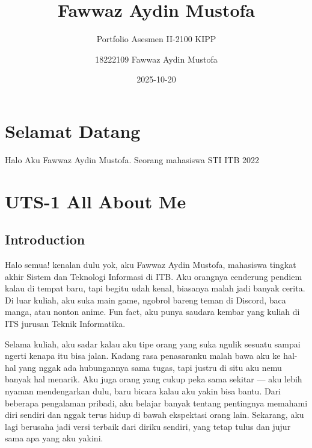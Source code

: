 \documentclass[
  letterpaper,
  DIV=11,
  numbers=noendperiod]{scrreprt}
\title{Fawwaz Aydin Mustofa}
\subtitle{Portfolio Asesmen II-2100 KIPP}
\author{18222109 Fawwaz Aydin Mustofa}
\date{2025-10-20}
\renewcommand*\contentsname{Table of contents}
\newcommand\contentsname{Table of contents}
\begin{document}
\maketitle

\renewcommand*\contentsname{Table of contents}
{
\hypersetup{linkcolor=}
\setcounter{tocdepth}{2}
\tableofcontents
}


\chapter*{Selamat Datang}\label{selamat-datang}


Halo Aku Fawwaz Aydin Mustofa. Seorang mahasiswa STI ITB 2022


\chapter{UTS-1 All About Me}\label{uts-1-all-about-me}

\section{\texorpdfstring{\textbf{Introduction}}{Introduction}}\label{introduction}

Halo semua! kenalan dulu yok, aku Fawwaz Aydin Mustofa, mahasiswa
tingkat akhir Sistem dan Teknologi Informasi di ITB. Aku orangnya
cenderung pendiem kalau di tempat baru, tapi begitu udah kenal, biasanya
malah jadi banyak cerita. Di luar kuliah, aku suka main game, ngobrol
bareng teman di Discord, baca manga, atau nonton anime. Fun fact, aku
punya saudara kembar yang kuliah di ITS jurusan Teknik Informatika.

Selama kuliah, aku sadar kalau aku tipe orang yang suka ngulik sesuatu
sampai ngerti kenapa itu bisa jalan. Kadang rasa penasaranku malah bawa
aku ke hal-hal yang nggak ada hubungannya sama tugas, tapi justru di
situ aku nemu banyak hal menarik. Aku juga orang yang cukup peka sama
sekitar --- aku lebih nyaman mendengarkan dulu, baru bicara kalau aku
yakin bisa bantu. Dari beberapa pengalaman pribadi, aku belajar banyak
tentang pentingnya memahami diri sendiri dan nggak terus hidup di bawah
ekspektasi orang lain. Sekarang, aku lagi berusaha jadi versi terbaik
dari diriku sendiri, yang tetap tulus dan jujur sama apa yang aku
yakini.
\end{document}
